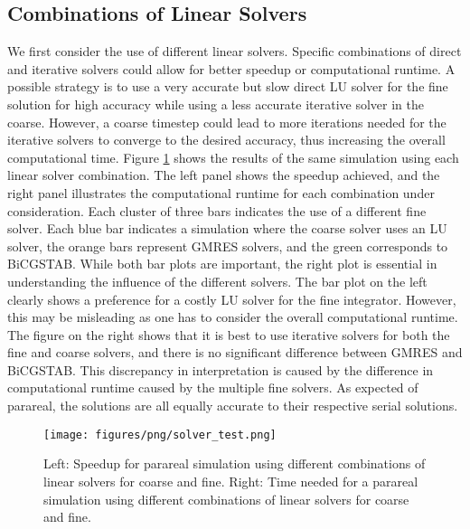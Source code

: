 \subsection{Combinations of Linear Solvers}
We first consider the use of different linear solvers. Specific combinations of direct and iterative solvers could allow for better speedup or computational runtime. A possible strategy is to use a very accurate but slow direct LU solver for the fine solution for high accuracy while using a less accurate iterative solver in the coarse. However, a coarse timestep could lead to more iterations needed for the iterative solvers to converge to the desired accuracy, thus increasing the overall computational time. Figure \ref{fig: linear solver combination} shows the results of the same simulation using each linear solver combination. The left panel shows the speedup achieved, and the right panel illustrates the computational runtime for each combination under consideration. Each cluster of three bars indicates the use of a different fine solver. Each blue bar indicates a simulation where the coarse solver uses an LU solver, the orange bars represent GMRES solvers, and the green corresponds to BiCGSTAB. While both bar plots are important, the right plot is essential in understanding the influence of the different solvers. The bar plot on the left clearly shows a preference for a costly LU solver for the fine integrator. However, this may be misleading as one has to consider the overall computational runtime. The figure on the right shows that it is best to use iterative solvers for both the fine and coarse solvers, and there is no significant difference between GMRES and BiCGSTAB. This discrepancy in interpretation is caused by the difference in computational runtime caused by the multiple fine solvers. 
As expected of parareal, the solutions are all equally accurate to their respective serial solutions. 
  \begin{figure}[h]
    \centering
    \texttt{[image: figures/png/solver\_test.png]}
    \caption{Left: Speedup for parareal simulation using different combinations of linear solvers for coarse and fine. Right: Time needed for a parareal simulation using different combinations of linear solvers for coarse and fine.}
    \label{fig: linear solver combination}
\end{figure}


